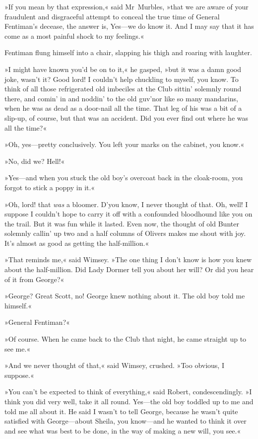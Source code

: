 »If you mean by that expression,« said Mr~Murbles, »that we are aware of your fraudulent and disgraceful attempt to conceal the true time of General Fentiman's decease, the answer is, Yes—we do know it. And I may say that it has come as a most painful shock to my feelings.«

Fentiman flung himself into a chair, slapping his thigh and roaring with laughter.

»I might have known you'd be on to it,« he gasped, »but it was a damn good joke, wasn't it? Good lord! I couldn't help chuckling to myself, you know. To think of all those refrigerated old imbeciles at the Club sittin' solemnly round there, and comin' in and noddin' to the old guv'nor like so many mandarins, when he was as dead as a door-nail all the time. That leg of his was a bit of a slip-up, of course, but that was an accident. Did you ever find out where he was all the time?«

»Oh, yes—pretty conclusively. You left your marks on the cabinet, you know.«

»No, did we? Hell!«

»Yes—and when you stuck the old boy's overcoat back in the cloak-room, you forgot to stick a poppy in it.«

»Oh, lord! that \textit{was} a bloomer. D'you know, I never thought of that. Oh, well! I suppose I couldn't hope to carry it off with a confounded bloodhound like you on the trail. But it was fun while it lasted. Even now, the thought of old Bunter solemnly callin' up two and a half columns of Olivers makes me shout with joy. It's almost as good as getting the half-million.«

»That reminds me,« said Wimsey. »The one thing I don't know is how you knew about the half-million. Did Lady Dormer tell you about her will? Or did you hear of it from George?«

»George? Great Scott, no! George knew nothing about it. The old boy told me himself.«

»General Fentiman?«

»Of course. When he came back to the Club that night, he came straight up to see me.«

»And we never thought of that,« said Wimsey, crushed. »Too obvious, I suppose.«

»You can't be expected to think of everything,« said Robert, condescendingly. »I think you did very well, take it all round. Yes—the old boy toddled up to me and told me all about it. He said I wasn't to tell George, because he wasn't quite satisfied with George—about Sheila, you know—and he wanted to think it over and see what was best to be done, in the way of making a new will, you see.«

